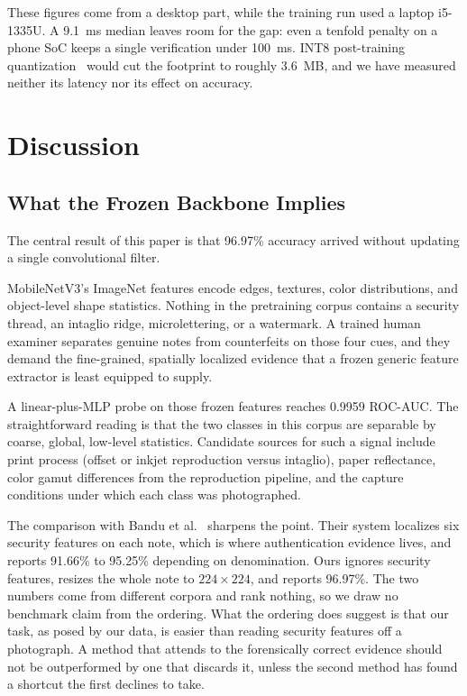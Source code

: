 \documentclass[conference]{IEEEtran}
\begin{document}
These figures come from a desktop part, while the training run used a laptop
i5-1335U. A 9.1~ms median leaves room for the gap: even a tenfold penalty on a
phone SoC keeps a single verification under 100~ms. INT8 post-training
quantization~\cite{jacob2018quantization} would cut the footprint to roughly
3.6~MB, and we have measured neither its latency nor its effect on accuracy.

\section{Discussion}
\label{sec:discussion}

\subsection{What the Frozen Backbone Implies}

The central result of this paper is that 96.97\% accuracy arrived without
updating a single convolutional filter.

MobileNetV3's ImageNet features encode edges, textures, color distributions, and
object-level shape statistics. Nothing in the pretraining corpus contains a
security thread, an intaglio ridge, microlettering, or a watermark. A trained
human examiner separates genuine notes from counterfeits on those four cues, and
they demand the fine-grained, spatially localized evidence that a frozen generic
feature extractor is least equipped to supply.

A linear-plus-MLP probe on those frozen features reaches 0.9959 ROC-AUC. The
straightforward reading is that the two classes in this corpus are separable by
coarse, global, low-level statistics. Candidate sources for such a signal
include print process (offset or inkjet reproduction versus intaglio), paper
reflectance, color gamut differences from the reproduction pipeline, and the
capture conditions under which each class was photographed.

The comparison with Bandu et al.~\cite{bandu2024indian} sharpens the point.
Their system localizes six security features on each note, which is where
authentication evidence lives, and reports 91.66\% to 95.25\% depending on
denomination. Ours ignores security features, resizes the whole note to
$224 \times 224$, and reports 96.97\%. The two numbers come from different
corpora and rank nothing, so we draw no benchmark claim from the ordering. What
the ordering does suggest is that our task, as posed by our data, is easier than
reading security features off a photograph. A method that attends to the
forensically correct evidence should not be outperformed by one that discards
it, unless the second method has found a shortcut the first declines to take.
\end{document}
